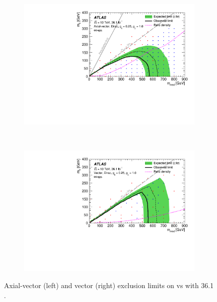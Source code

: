 \begin{figure}[htb]
    \centering
    \begin{subfigure}[b]{0.48\textwidth}
        \includegraphics[width=\textwidth]{Figures/limits_dmA.pdf}
        \label{fig:limits_dmA}
    \end{subfigure}
    ~ %
    \begin{subfigure}[b]{0.48\textwidth}
        \includegraphics[width=\textwidth]{Figures/limits_dmV.pdf}
        \label{fig:limits_dmV}
    \end{subfigure}
    \caption{Axial-vector (left) and vector (right) exclusion limits on \mchi vs \mmed with 36.1 \ifb.}
\label{fig:limits}
\end{figure}


